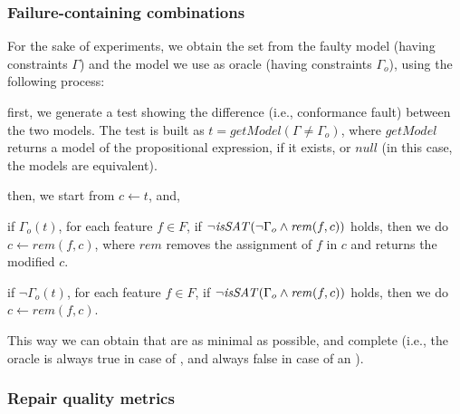 \begin{tikzborder}{\cite{Gargantini16:validation}}
\begin{tikzborder}{\cite{gargantini_combinatorial_2017}}
\begin{tikzborder}{\cite{garn2019}}
\begin{tikzborder}{\cite{arcaini2019achieving}}
\begin{tikzborder}{\cite{arcaini2019varivolution}}
		\subsubsection{Failure-containing combinations}
		
		\bb For the sake of experiments, we obtain the set \fccSet from the faulty model \m (having constraints $\Gamma$) and the model we use as oracle \mO (having constraints $\Gamma_o$), using the following process:
		\begin{compactenum}
			\item first, we generate a test showing the difference (i.e., conformance fault) between the two models. The test is built as $t = \mathit{getModel}(\Gamma \neq \Gamma_o)$, where $\mathit{getModel}$ returns a model of the propositional expression, if it exists, or $\mathit{null}$ (in this case, the models are equivalent).
			\item then, we start from $c \leftarrow t$, and,
			\begin{compactitem}
				\item if $\Gamma_o(t)$, for each feature $f \in F$, if $\neg \mathit{isSAT}(\neg \Gamma_o \wedge \mathit{rem}(f, c))$ holds, then we do $c \leftarrow \mathit{rem}(f, c)$, where $\mathit{rem}$ removes the assignment of $f$ in $c$ and returns the modified $c$.
				\item if $\neg \Gamma_o(t)$, for each feature $f \in F$, if $\neg \mathit{isSAT}(\Gamma_o \wedge \mathit{rem}(f, c))$ holds, then we do $c \leftarrow \mathit{rem}(f, c)$.
			\end{compactitem}
		\end{compactenum}
		This way we can obtain \fccs that are as minimal as possible, and complete (i.e., the oracle is always true in case of \overConstr \fcc, and always false in case of an \underConstr \fcc).\be
		
		\subsubsection{Repair quality metrics}\label{sec:qualityMetrics}
		

\end{tikzborder}
\end{tikzborder}
\end{tikzborder}
\end{tikzborder}
\end{tikzborder}
